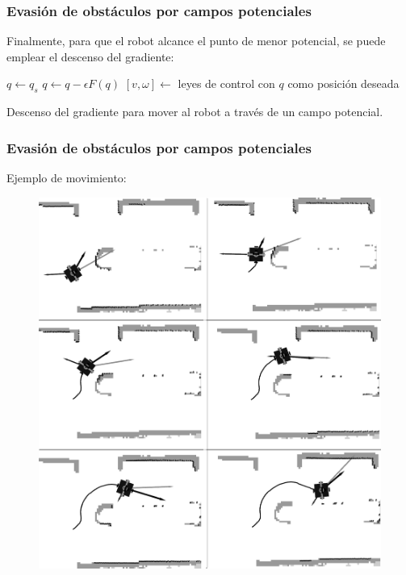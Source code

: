 \begin{frame}\frametitle{Evasión de obstáculos por campos potenciales}
  Finalmente, para que el robot alcance el punto de menor potencial, se puede emplear el descenso del gradiente:
  \[\]
  \begin{algorithm}[H]
  \DontPrintSemicolon
  \;
$q \leftarrow q_s$\;
{
  $q \leftarrow q - \epsilon F(q)$\;
  $[v,\omega] \leftarrow $ leyes de control con $q$ como posición deseada\;
}
  \caption{Descenso del gradiente para mover al robot a través de un campo potencial.}
  \label{alg:PotFields}
\end{algorithm}
\end{frame}

\begin{frame}\frametitle{Evasión de obstáculos por campos potenciales}
  Ejemplo de movimiento:
  \begin{figure}
    \centering
    \includegraphics[height=0.85\textheight]{Figures/PotFieldsExecution.png}
  \end{figure}
\end{frame}

